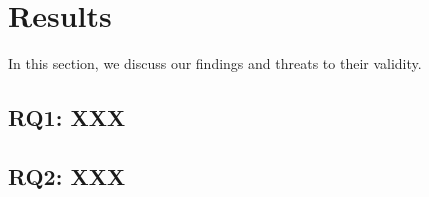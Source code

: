 \section{Results}
\label{sec:results}
In this section, we discuss our findings and threats to their validity.

\subsection{RQ1: XXX}

\subsection{RQ2: XXX}

